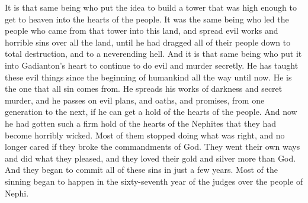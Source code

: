 It is that same being who put the idea to build a tower that was high enough to get to heaven into the hearts of the people. It was the same being who led the people who came from that tower into this land, and spread evil works and horrible sins over all the land, until he had dragged all of their people down to total destruction, and to a neverending hell.
\bverse \iffalse Yea, it is that same being who put it into the heart of Gadianton to still carry on the work of darkness, and of secret murder; and he has brought it forth from the beginning of man even down to this time. \fi
And it is that same being who put it into Gadianton's heart to continue to do evil and murder secretly. He has taught these evil things since the beginning of humankind all the way until now.
\bverse \iffalse And behold, it is he who is the author of all sin. And behold, he doth carry on his works of darkness and secret murder, and doth hand down their plots, and their oaths, and their covenants, and their plans of awful wickedness, from generation to generation according as he can get hold upon the hearts of the children of men. \fi
He is the one that all sin comes from. He spreads his works of darkness and secret murder, and he passes on evil plans, and oaths, and promises, from one generation to the next, if he can get a hold of the hearts of the people.
\bverse \iffalse And now behold, he had got great hold upon the hearts of the Nephites; yea, insomuch that they had become exceedingly wicked; yea, the more part of them had turned out of the way of righteousness, and did trample under their feet the commandments of God, and did turn unto their own ways, and did build up unto themselves idols of their gold and their silver. \fi
And now he had gotten such a firm hold of the hearts of the Nephites that they had become horribly wicked. Most of them stopped doing what was right, and no longer cared if they broke the commandments of God. They went their own ways and did what they pleased, and they loved their gold and silver more than God.
\bverse \iffalse And it came to pass that all these iniquities did come unto them in the space of not many years, insomuch that a more part of it had come unto them in the sixty and seventh year of the reign of the judges over the people of Nephi. \fi
And they began to commit all of these sins in just a few years. Most of the sinning began to happen in the sixty-seventh year of the judges over the people of Nephi.
\bverse \iffalse And they did grow in their iniquities in the sixty and eighth year also. \fi
